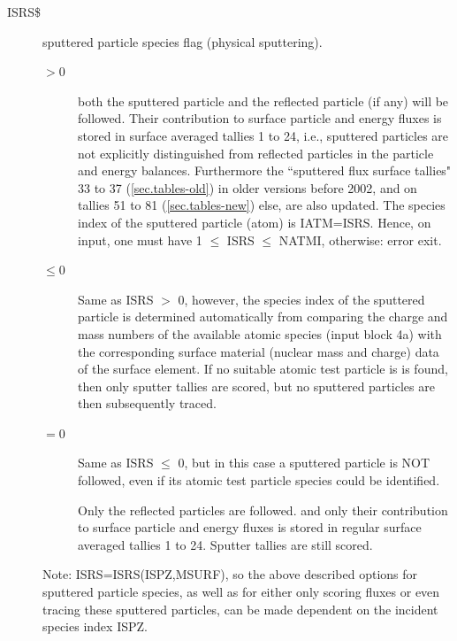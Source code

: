 \begin{description}
  \item[ISRS\$] sputtered particle species flag (physical sputtering).

        \begin{description}
          \item[$> 0$] both the sputtered particle and the reflected particle (if any)
                will be followed.
                Their contribution to surface particle and energy fluxes is stored in surface
                averaged tallies 1 to 24, i.e., sputtered particles are not explicitly
                distinguished from reflected particles in the particle and energy balances.
                Furthermore the ``sputtered flux surface tallies" 33 to 37
                (\cref{sec.tables-old}) in older versions before 2002, and on tallies 51 to 81
                (\cref{sec.tables-new}) else,  are also updated.
                The species index of the sputtered particle (atom) is IATM=ISRS.
                Hence, on input, one must have 1 $\le$ ISRS $\le$ NATMI, otherwise: error exit.

          \item[$\leq 0$] Same as ISRS $>$ 0, however, the species index of the sputtered
                particle is determined automatically from comparing the charge and mass numbers
                of the available atomic species (input block 4a) with the corresponding surface
                material (nuclear mass and charge) data of the surface element.
                If no suitable atomic test particle is is found, then only sputter tallies are
                scored, but no sputtered particles are then subsequently traced.
          \item[$= 0$] Same as ISRS $\leq$ 0, but in this case a sputtered particle is
                NOT followed, even if its atomic test particle species could be identified.

                Only the reflected particles are followed.
                and only their contribution to surface particle
                and energy fluxes is stored in regular surface averaged tallies
                1 to 24.
                Sputter tallies are still scored.

        \end{description}

        Note: ISRS=ISRS(ISPZ,MSURF), so the above described options for sputtered
        particle species, as well as for either only scoring fluxes or even tracing
        these sputtered particles, can be made dependent on the incident species index
        ISPZ.


\end{description}

